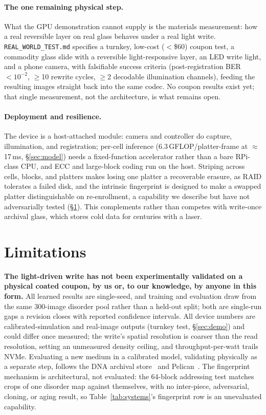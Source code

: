 \documentclass[letterpaper,twocolumn,10pt]{article}
\begin{document}
\paragraph{The one remaining physical step.} What the GPU demonstration cannot supply
is the materials measurement: how a real reversible layer on real glass behaves under a
real light write. \texttt{REAL\_WORLD\_TEST.md} specifies a turnkey, low-cost
($<$\$60) coupon test, a commodity glass slide with a reversible light-responsive
layer, an LED write light, and a phone camera, with falsifiable success criteria
(post-registration BER $<10^{-2}$, $\geq$10 rewrite cycles, $\geq$2 decodable
illumination channels), feeding the resulting images straight back into the same
codec. No coupon results exist yet; that single measurement, not the architecture,
is what remains open.

\paragraph{Deployment and resilience.} The device is a host-attached module: camera
and controller do capture, illumination, and registration; per-cell inference
(6.3\,GFLOP/platter-frame at $\approx$17\,ms, \S\ref{sec:model}) needs a fixed-function
accelerator rather than a bare RPi-class CPU, and ECC and large-block coding run on the
host. Striping across cells, blocks, and platters makes losing one platter a recoverable
erasure, as RAID tolerates a failed disk, and the intrinsic fingerprint is designed to
make a swapped platter distinguishable on re-enrollment, a capability we describe but
have not adversarially tested (\S\ref{sec:limits}). This complements rather than
competes with write-once archival glass, which stores cold data for centuries with a
laser.

\section{Limitations}
\label{sec:limits}
\textbf{The light-driven write has not been experimentally validated on a physical
coated coupon, by us or, to our knowledge, by anyone in this form.} All learned
results are single-seed, and training and evaluation draw from the same 300-image disorder
pool rather than a held-out split; both are single-run gaps a revision closes with reported
confidence intervals. All device numbers are calibrated-simulation and real-image outputs
(turnkey test, \S\ref{sec:demo}) and could differ once measured; the write's spatial
resolution is coarser than the read resolution, setting an unmeasured density ceiling, and
throughput-per-watt trails NVMe.
Evaluating a new medium in a calibrated model, validating physically as a separate step,
follows the DNA archival store~\cite{dna_asplos16} and Pelican~\cite{pelican_osdi14}. The
fingerprint mechanism is architectural, not evaluated: the 64-block addressing test matches
crops of one disorder map against themselves, with no inter-piece, adversarial, cloning, or
aging result, so Table~\ref{tab:systems}'s fingerprint row is an unevaluated capability.
\end{document}
